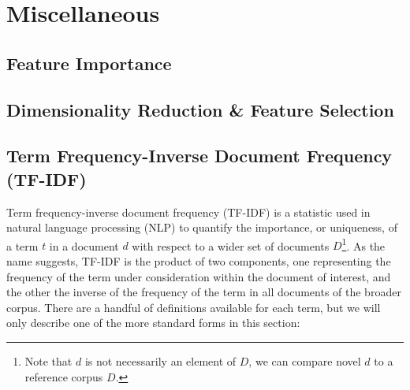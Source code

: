 \chapter{Miscellaneous}
\label{chap:misc}

\section{Feature Importance}
\label{misc:feature_importance}

\section{Dimensionality Reduction \& Feature Selection}
\label{misc:m_reduction}

\section{Term Frequency-Inverse Document Frequency (TF-IDF)}
\label{misc:tfidf}

Term frequency-inverse document frequency (TF-IDF) is a statistic
used in natural language processing (NLP) to quantify
the importance, or uniqueness, of a term $t$ in a document $d$
with respect to a wider set of documents $D$\footnote{Note that $d$ is not necessarily an element of $D$, we can compare novel $d$ to a reference corpus $D$.}.
As the name suggests, TF-IDF is the product of two components,
one representing the frequency of the term under consideration within the document of interest,
and the other the inverse of the frequency of the term in all documents of the broader corpus.
There are a handful of definitions available for each term, but we will only describe
one of the more standard forms in this section:

